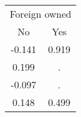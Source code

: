 \begin{tabular}{cc}
\toprule
\multicolumn{2}{c}{Foreign owned} \\
\cmidrule(lr){1-2}
No & Yes \\
\midrule
-0.141 & 0.919 \\
0.199 & . \\
-0.097 & . \\
0.148 & 0.499 \\
\bottomrule
\end{tabular}
